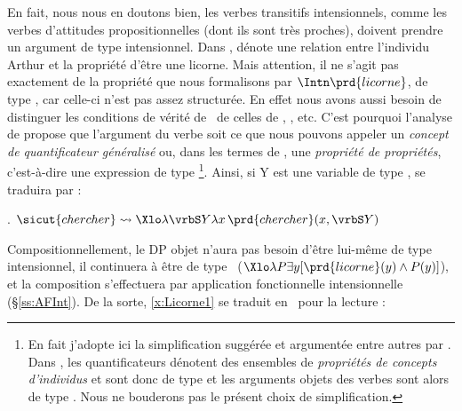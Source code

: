 
  
  En fait, nous nous en doutons bien, les verbes transitifs intensionnels, comme les verbes d'attitudes propositionnelles (dont ils sont très proches), doivent prendre un argument de type intensionnel.  Dans \Last,  dénote une relation entre l'individu Arthur et la  propriété d'être une licorne.  Mais attention, il ne s'agit pas exactement de la propriété que nous formalisons par $\Intn\prd{licorne}$, de type , car celle-ci n'est pas assez structurée.  En effet nous avons aussi besoin de distinguer les conditions de vérité de \Last\ de celles de , , etc.
  C'est pourquoi l'analyse de \citet{PTQ} propose que l'argument du verbe soit ce que nous pouvons appeler un \emph{concept de quantificateur généralisé} ou, dans les termes de \citeauthor{PTQ}, une \emph{propriété de propriétés},
c'est-à-dire une expression de type %
  \footnote{En fait j'adopte ici la simplification suggérée et argumentée entre autres par \citet[chap.~7, p.~188 et n.~14 p.~250]{DWP:81}. 
Dans \citet{PTQ}, les quantificateurs dénotent des ensembles de \emph{propriétés de concepts d'individus} et sont donc de type  et les arguments objets des verbes sont alors de type . Nous ne bouderons pas le présent choix de simplification.\label{fn:DWP81simpl}}.
Ainsi, si \vrbS Y est une variable de type ,  se traduira  par :


\fussy


\ex.
\(\sicut{chercher} \leadsto \Xlo\lambda\vrbS Y\lambda x\,\prd{chercher}(x,\vrbS Y)\)

\largerpage[-1]

Compositionnellement, le DP objet n'aura pas besoin d'être lui-même de type intensionnel, il continuera à être de type \ett\ ($\Xlo\lambda P\exists y[\prd{licorne}(y)\wedge P(y)]$), et la composition s'effectuera par application fonctionnelle intensionnelle (\S\ref{ss:AFInt}). De la sorte, \ref{x:Licorne1} se traduit en \Next\ pour la lecture  :


